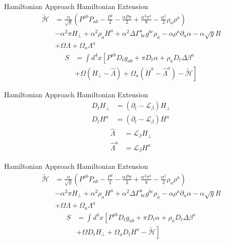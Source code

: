 \documentclass[xcolor=dvipsnames]{beamer}
\begin{document}
	\begin{frame}{Hamiltonian Approach}
		Hamiltonian Extension
		\begin{align*}
				\tilde{\mathscr{H}} & = \frac{\alpha}{\sqrt{g}}\left(P^{ab}P_{ab} - \frac{P^{2}}{2} - \frac{\alpha P \pi}{2} + \frac{\alpha^{2}\pi^{2}}{8} - \frac{\alpha^{2}}{2}\rho_{a}\rho^{a}\right)\\
				& -\alpha^{2}\pi H_{\perp} + \alpha^{2}\rho_{a}H^{a} + \alpha^{2}\Delta\Gamma^{a}_{~bc}g^{bc}\rho_{a} - \alpha \rho^{a}\partial_{a}\alpha - \alpha\sqrt{g}R\\
				& + \Omega\Lambda + \Omega_{a}\Lambda^{a}
		\end{align*}
		\begin{align*}
			S &= \int d^{4}x \left[ P^{ab}D_{t}g_{ab} + \pi D_{t}\alpha + \rho_{a}D_{t}\Delta\beta^{a}\right. \\
			& \left. + \Omega \left({\dot H}_{\perp} - {\hat \Lambda}\right) + \Omega_{a}\left({\dot H}^{a} - {\hat \Lambda}^{a}\right) - \tilde{\mathscr{H}}\right]
		\end{align*}	
	\end{frame}
	\begin{frame}{Hamiltonian Approach}
		Hamiltonian Extension
		\begin{align*}
			D_{t}H_{\perp} &= \left(\partial_{t} - \mathcal{L}_{\beta}\right)H_{\perp}\\
			D_{t}H^{a} &= \left(\partial_{t} - \mathcal{L}_{\beta}\right)H^{a}
		\end{align*}
		\pause
		\begin{align*}
			{\hat \Lambda} &= \mathcal{L}_{\beta}H_{\perp}\\
			{\hat \Lambda}^{a} &= \mathcal{L}_{\beta}H^{a}
		\end{align*}
	\end{frame}
	\begin{frame}{Hamiltonian Approach}
		Hamiltonian Extension
		\begin{align*}
				\tilde{\mathscr{H}} & = \frac{\alpha}{\sqrt{g}}\left(P^{ab}P_{ab} - \frac{P^{2}}{2} - \frac{\alpha P \pi}{2} + \frac{\alpha^{2}\pi^{2}}{8} - \frac{\alpha^{2}}{2}\rho_{a}\rho^{a}\right)\\
				& -\alpha^{2}\pi H_{\perp} + \alpha^{2}\rho_{a}H^{a} + \alpha^{2}\Delta\Gamma^{a}_{~bc}g^{bc}\rho_{a} - \alpha \rho^{a}\partial_{a}\alpha - \alpha\sqrt{g}R\\
				& + \Omega\Lambda + \Omega_{a}\Lambda^{a}
		\end{align*}
		\begin{align*}
			S &= \int d^{4}x \left[ P^{ab}D_{t}g_{ab} + \pi D_{t}\alpha + \rho_{a}D_{t}\Delta\beta^{a}\right. \\
			& \left. + \Omega D_{t}H_{\perp} + \Omega_{a}D_{t}H^{a} - \tilde{\mathscr{H}}\right]
		\end{align*}	
	\end{frame}
\end{document}
